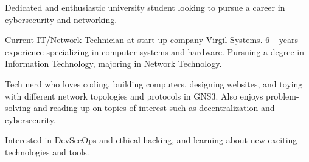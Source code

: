 


\begin{cvparagraph}

Dedicated and enthusiastic university student looking to pursue a career in cybersecurity and networking. 
\end{cvparagraph}



\begin{cvparagraph}

Current IT/Network Technician at start-up company Virgil Systems. 6+ years experience specializing in computer systems and hardware. Pursuing a degree in Information Technology, majoring in Network Technology.

Tech nerd who loves coding, building computers, designing websites, and toying with different network topologies and protocols in GNS3. Also enjoys problem-solving and reading up on topics of interest such as decentralization and cybersecurity.

Interested in DevSecOps and ethical hacking, and learning about new exciting technologies and tools.
\end{cvparagraph}
